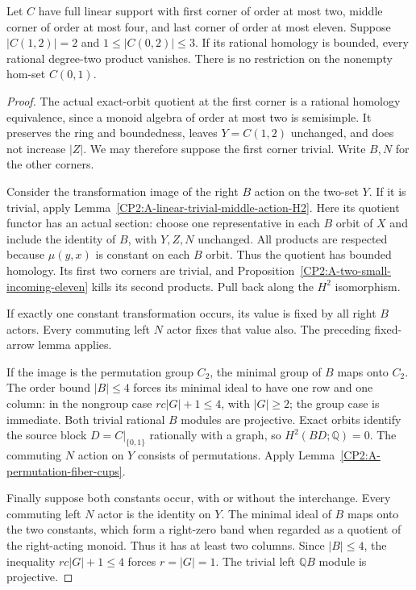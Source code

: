 \begin{theorem}
\label{CP2:A-linear-four-middle-binary-short-long}
Let $C$ have full linear support with first corner of
order at most two, middle corner of order at most four,
and last corner of order at most eleven.  Suppose
$|C(1,2)|=2$ and $1\leq|C(0,2)|\leq3$.
If its rational homology is bounded, every rational
degree-two product vanishes.  There is no restriction
on the nonempty hom-set $C(0,1)$.
\end{theorem}
\begin{proof}
The actual exact-orbit quotient at the first corner is
a rational homology equivalence, since a monoid algebra
of order at most two is semisimple.  It preserves the
ring and boundedness, leaves $Y=C(1,2)$ unchanged, and
does not increase $|Z|$.  We may therefore suppose the
first corner trivial.  Write $B,N$ for the other corners.

Consider the transformation image of the right $B$ action
on the two-set $Y$.  If it is trivial, apply
Lemma~\ref{CP2:A-linear-trivial-middle-action-H2}.
Here its quotient functor has an actual section: choose
one representative in each $B$ orbit of $X$ and include
the identity of $B$, with $Y,Z,N$ unchanged.  All products
are respected because $\mu(y,x)$ is constant on each
$B$ orbit.  Thus the quotient has bounded homology.
Its first two corners are trivial, and
Proposition~\ref{CP2:A-two-small-incoming-eleven} kills
its second products.  Pull back along the $H^2$ isomorphism.

If exactly one constant transformation occurs, its value
is fixed by all right $B$ actors.  Every commuting left
$N$ actor fixes that value also.  The preceding fixed-arrow
lemma applies.

If the image is the permutation group $C_2$, the minimal
group of $B$ maps onto $C_2$.  The order bound $|B|\leq4$
forces its minimal ideal to have one row and one column:
in the nongroup case $rc|G|+1\leq4$, with $|G|\geq2$;
the group case is immediate.  Both trivial rational
$B$ modules are projective.  Exact orbits identify the
source block $D=C|_{\{0,1\}}$ rationally with a graph,
so $H^2(BD;\mathbb Q)=0$.  The commuting $N$ action on
$Y$ consists of permutations.  Apply
Lemma~\ref{CP2:A-permutation-fiber-cups}.

Finally suppose both constants occur, with or without
the interchange.  Every commuting left $N$ actor is
the identity on $Y$.  The minimal ideal of $B$ maps
onto the two constants, which form a right-zero band
when regarded as a quotient of the right-acting monoid.
Thus it has at least two columns.  Since $|B|\leq4$,
the inequality $rc|G|+1\leq4$ forces $r=|G|=1$.
The trivial left $\mathbb QB$ module is projective.


\end{proof}
